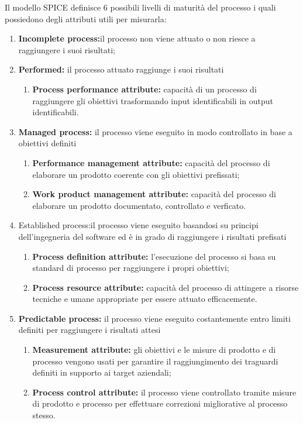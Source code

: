 \documentclass[12pt,a4paper]{article}
\begin{document}
Il modello SPICE definisce 6 possibili livelli di maturità del processo i quali possiedono
degli attributi utili per misurarla:
\begin{enumerate}
	\item\textbf{Incomplete process:}il processo non viene attuato o non riesce a raggiungere i
	suoi risultati;
	\item\textbf{Performed:} il processo attuato raggiunge i suoi risultati
	\begin{enumerate}
		\item\textbf{Process performance attribute:} capacità di un processo di raggiungere gli obiettivi trasformando input identificabili in output identificabili.
	\end{enumerate}
	
	\item\textbf{Managed process:} il processo viene eseguito in modo controllato in base a
	obiettivi definiti
	\begin{enumerate}
		\item\textbf{Performance management attribute:} capacità del processo di elaborare
		un prodotto coerente con gli obiettivi prefissati;
		\item\textbf{ Work product management attribute:} capacità del processo di elaborare
		un prodotto documentato, controllato e verficato.
	\end{enumerate}
	\item{Established process:}il processo viene eseguito basandosi su principi dell'ingegneria
	del software ed è in grado di raggiungere i risultati prefisati
	\begin{enumerate}
		\item\textbf {Process definition attribute: }l'esecuzione del processo si basa su standard
		di processo per raggiungere i propri obiettivi;
		\item\textbf{Process resource attribute: }capacità del processo di attingere a risorse
		tecniche e umane appropriate per essere attuato efficacemente.
	\end{enumerate}
	\item\textbf{Predictable process:} il processo viene eseguito costantemente entro limiti definiti
	per raggiungere i risultati attesi
	\begin{enumerate}
		\item \textbf{ Measurement attribute:} gli obiettivi e le misure di prodotto e di processo
		vengono usati per garantire il raggiungimento dei traguardi definiti in
		supporto ai target aziendali;
		\item\textbf{ Process control attribute:} il processo viene controllato tramite misure di
		prodotto e processo per effettuare correzioni migliorative al processo stesso.
	\end{enumerate}
	

\end{enumerate}
\end{document}

